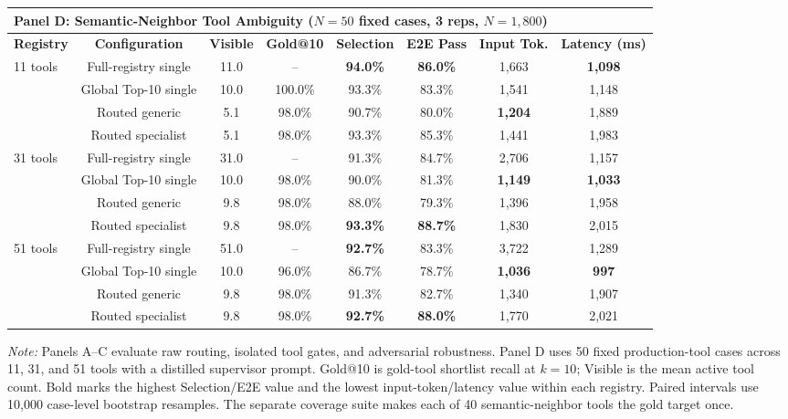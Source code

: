 \begin{table}[!htbp]
{\begin{tabular}{lccccccc}
\midrule
\multicolumn{8}{l}{\textbf{Panel D: Semantic-Neighbor Tool Ambiguity ($N=50$ fixed cases, 3 reps, $N=1,800$)}} \\
\midrule
\textbf{Registry} & \textbf{Configuration} & \textbf{Visible} & \textbf{Gold@10} & \textbf{Selection} & \textbf{E2E Pass} & \textbf{Input Tok.} & \textbf{Latency (ms)} \\
\midrule
\multirow{4}{*}{11 tools} & Full-registry single & 11.0 & -- & \textbf{94.0\%} & \textbf{86.0\%} & 1,663 & \textbf{1,098} \\
 & Global Top-10 single & 10.0 & 100.0\% & 93.3\% & 83.3\% & 1,541 & 1,148 \\
 & Routed generic & 5.1 & 98.0\% & 90.7\% & 80.0\% & \textbf{1,204} & 1,889 \\
 & Routed specialist & 5.1 & 98.0\% & 93.3\% & 85.3\% & 1,441 & 1,983 \\
\midrule
\multirow{4}{*}{31 tools} & Full-registry single & 31.0 & -- & 91.3\% & 84.7\% & 2,706 & 1,157 \\
 & Global Top-10 single & 10.0 & 98.0\% & 90.0\% & 81.3\% & \textbf{1,149} & \textbf{1,033} \\
 & Routed generic & 9.8 & 98.0\% & 88.0\% & 79.3\% & 1,396 & 1,958 \\
 & Routed specialist & 9.8 & 98.0\% & \textbf{93.3\%} & \textbf{88.7\%} & 1,830 & 2,015 \\
\midrule
\multirow{4}{*}{51 tools} & Full-registry single & 51.0 & -- & \textbf{92.7\%} & 83.3\% & 3,722 & 1,289 \\
 & Global Top-10 single & 10.0 & 96.0\% & 86.7\% & 78.7\% & \textbf{1,036} & \textbf{997} \\
 & Routed generic & 9.8 & 98.0\% & 91.3\% & 82.7\% & 1,340 & 1,907 \\
 & Routed specialist & 9.8 & 98.0\% & \textbf{92.7\%} & \textbf{88.0\%} & 1,770 & 2,021 \\
\bottomrule
\end{tabular}
}
\medskip
\parbox{\columnwidth}{\footnotesize\emph{Note:} Panels A--C evaluate raw routing, isolated tool gates, and adversarial robustness. Panel D uses 50 fixed production-tool cases across 11, 31, and 51 tools with a distilled supervisor prompt. Gold@10 is gold-tool shortlist recall at $k=10$; Visible is the mean active tool count. Bold marks the highest Selection/E2E value and the lowest input-token/latency value within each registry. Paired intervals use 10,000 case-level bootstrap resamples. The separate coverage suite makes each of 40 semantic-neighbor tools the gold target once.}
\end{table}

